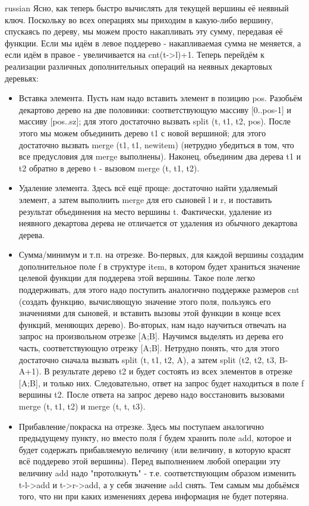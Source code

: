 \documentclass{article}
\begin{document}
\begin{otherlanguage*}{russian}
    Ясно, как теперь быстро вычислять для текущей вершины её неявный ключ. Поскольку во всех операциях мы приходим в какую-либо вершину, спускаясь по дереву, мы можем просто накапливать эту сумму, передавая её функции. Если мы идём в левое поддерево - накапливаемая сумма не меняется, а если идём в правое - увеличивается на cnt(t->l)+1.
    Теперь перейдём к реализации различных дополнительных операций на неявных декартовых деревьях:
    \begin{itemize}
    \item Вставка элемента.
    Пусть нам надо вставить элемент в позицию pos. Разобьём декартово дерево на две половинки: соответствующую массиву [0..pos-1] и массиву [pos..sz]; для этого достаточно вызвать split (t, t1, t2, pos). После этого мы можем объединить дерево t1 с новой вершиной; для этого достаточно вызвать merge (t1, t1, new\textunderscore item) (нетрудно убедиться в том, что все предусловия для merge выполнены). Наконец, объединим два дерева t1 и t2 обратно в дерево t - вызовом merge (t, t1, t2).
    \item Удаление элемента.
    Здесь всё ещё проще: достаточно найти удаляемый элемент, а затем выполнить merge для его сыновей l и r, и поставить результат объединения на место вершины t. Фактически, удаление из неявного декартова дерева не отличается от удаления из обычного декартова дерева.
    \item Сумма/минимум и т.п. на отрезке.
    Во-первых, для каждой вершины создадим дополнительное поле f в структуре item, в котором будет храниться значение целевой функции для поддерева этой вершины. Такое поле легко поддерживать, для этого надо поступить аналогично поддержке размеров cnt (создать функцию, вычисляющую значение этого поля, пользуясь его значениями для сыновей, и вставить вызовы этой функции в конце всех функций, меняющих дерево).
    Во-вторых, нам надо научиться отвечать на запрос на произвольном отрезке [A;B]. Научимся выделять из дерева его часть, соответствующую отрезку [A;B]. Нетрудно понять, что для этого достаточно сначала вызвать split (t, t1, t2, A), а затем split (t2, t2, t3, B-A+1). В результате дерево t2 и будет состоять из всех элементов в отрезке [A;B], и только них. Следовательно, ответ на запрос будет находиться в поле f вершины t2. После ответа на запрос дерево надо восстановить вызовами merge (t, t1, t2) и merge (t, t, t3).
    \item Прибавление/покраска на отрезке.
    Здесь мы поступаем аналогично предыдущему пункту, но вместо поля f будем хранить поле add, которое и будет содержать прибавляемую величину (или величину, в которую красят всё поддерево этой вершины). Перед выполнением любой операции эту величину add надо "протолкнуть" - т.е. соответствующим образом изменить t-l->add и t->r->add, а у себя значение add снять. Тем самым мы добьёмся того, что ни при каких изменениях дерева информация не будет потеряна.

\end{itemize}
\end{otherlanguage*}
\end{document}
